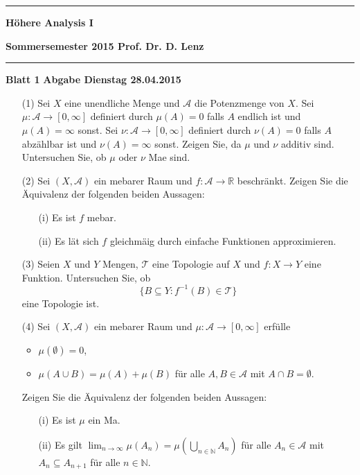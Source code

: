 \documentclass[12pt,a4paper]{article}
\newcommand{\IR}{{\mathbb{R}}}
\newcommand{\IN}{{\mathbb{N}}}
\begin{document}
\rule{\textwidth}{0.3pt}
\begin{center}
\textbf{\large H\"ohere Analysis I}
\end{center}
\textbf{Sommersemester 2015 \hfill Prof. Dr. D. Lenz}

\rule{\textwidth}{0.3pt}

%
%
\textbf{Blatt 1}\hfill %
\textbf{Abgabe Dienstag 28.04.2015}

\begin{itemize}

\item[(1)] Sei $X$ eine  unendliche Menge und $\mathcal{A}$ die
Potenzmenge von $X$. Sei $\mu : \mathcal{A}\longrightarrow
[0,\infty]$ definiert durch $\mu (A) = 0$ falls $A$ endlich   ist
und $\mu (A) = \infty$ sonst. Sei $\nu : \mathcal{A}\longrightarrow
[0,\infty]$ definiert durch $\nu (A) = 0$ falls $A$ abz\"ahlbar ist
und $\nu (A) = \infty$ sonst. Zeigen Sie, da\3 $\mu$ und $\nu$
additiv sind.  Untersuchen Sie, ob $\mu$ oder  $\nu$  Ma\3e sind. 


\item[(2)] Sei $(X,\mathcal{A})$ ein me\3barer Raum und $f :
\mathcal{A}\longrightarrow \IR$ beschr\"ankt.   Zeigen Sie die
\"Aquivalenz der folgenden beiden Aussagen:
\begin{itemize}
\item[(i)] Es ist $f$ me\3bar.

\item[(ii)] Es l\"a\3t sich $f$ gleichm\"a\3ig durch einfache
Funktionen approximieren.
\end{itemize}

\item[(3)] Seien $X$ und $Y$ Mengen,  $\mathcal{T}$ eine Topologie auf $X$ und
 $f : X\longrightarrow Y$ eine Funktion. Untersuchen Sie, ob
$$\{ B\subseteq Y : f^{-1} (B) \in \mathcal{T}\}$$
eine Topologie ist.


\item[(4)] Sei $(X,\mathcal{A})$ ein me\3barer Raum und $\mu :
\mathcal{A}\longrightarrow [0,\infty]$ erf\"ulle
\begin{itemize}
\item $\mu (\emptyset) = 0$,
\item $\mu (A\cup B) = \mu (A) + \mu (B)$ f\"ur alle $A,B\in
\mathcal{A}$ mit $A\cap B = \emptyset$.
\end{itemize}
Zeigen Sie die \"Aquivalenz der folgenden beiden Aussagen:
\begin{itemize}
\item[(i)] Es ist $\mu$ ein Ma\3.

\item[(ii)] Es gilt $\lim_{n\to \infty} \mu (A_n) = \mu\left(\bigcup_{n\in\mathbb{N}}
A_n \right)$ f\"ur alle $A_n\in \mathcal{A}$ mit $A_n \subseteq
A_{n+1}$ f\"ur alle $n\in \IN$.


\end{itemize}



\end{itemize}
\end{document}
